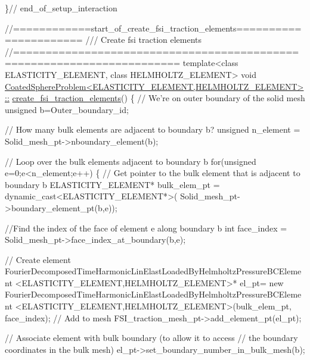 \begin{DoxyCodeInclude}
{\}\textcolor{comment}{// end\_of\_setup\_interaction}





\textcolor{comment}{//============start\_of\_create\_fsi\_traction\_elements======================}\textcolor{comment}{}
\textcolor{comment}{/// Create fsi traction elements }
\textcolor{comment}{}\textcolor{comment}{//=======================================================================}
\textcolor{keyword}{template}<\textcolor{keyword}{class} ELASTICITY\_ELEMENT, \textcolor{keyword}{class} HELMHOLTZ\_ELEMENT>
\textcolor{keywordtype}{void} \hyperlink{classCoatedSphereProblem_a2d342158b3058cd5392e2de3fd7595da}{CoatedSphereProblem<ELASTICITY\_ELEMENT,HELMHOLTZ\_ELEMENT>::}
\hyperlink{classCoatedSphereProblem_a2d342158b3058cd5392e2de3fd7595da}{create\_fsi\_traction\_elements}()
\{
 \textcolor{comment}{// We're on outer boundary of the solid mesh}
 \textcolor{keywordtype}{unsigned} b=Outer\_boundary\_id;

 \textcolor{comment}{// How many bulk elements are adjacent to boundary b?}
 \textcolor{keywordtype}{unsigned} n\_element = Solid\_mesh\_pt->nboundary\_element(b);
 
 \textcolor{comment}{// Loop over the bulk elements adjacent to boundary b}
 \textcolor{keywordflow}{for}(\textcolor{keywordtype}{unsigned} e=0;e<n\_element;e++)
  \{
   \textcolor{comment}{// Get pointer to the bulk element that is adjacent to boundary b}
   ELASTICITY\_ELEMENT* bulk\_elem\_pt = \textcolor{keyword}{dynamic\_cast<}ELASTICITY\_ELEMENT*\textcolor{keyword}{>}(
    Solid\_mesh\_pt->boundary\_element\_pt(b,e));
   
   \textcolor{comment}{//Find the index of the face of element e along boundary b}
   \textcolor{keywordtype}{int} face\_index = Solid\_mesh\_pt->face\_index\_at\_boundary(b,e);
   
   \textcolor{comment}{// Create element}
   FourierDecomposedTimeHarmonicLinElastLoadedByHelmholtzPressureBCElement
    <ELASTICITY\_ELEMENT,HELMHOLTZ\_ELEMENT>* el\_pt=
    \textcolor{keyword}{new} FourierDecomposedTimeHarmonicLinElastLoadedByHelmholtzPressureBCElement
    <ELASTICITY\_ELEMENT,HELMHOLTZ\_ELEMENT>(bulk\_elem\_pt,
                                           face\_index);   
   \textcolor{comment}{// Add to mesh}
   FSI\_traction\_mesh\_pt->add\_element\_pt(el\_pt);
   
   \textcolor{comment}{// Associate element with bulk boundary (to allow it to access}
   \textcolor{comment}{// the boundary coordinates in the bulk mesh)}
   el\_pt->set\_boundary\_number\_in\_bulk\_mesh(b); 
   
}
\end{DoxyCodeInclude}
